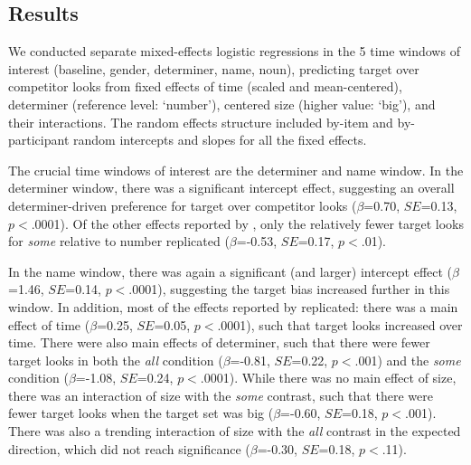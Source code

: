 \documentclass[10pt,letterpaper]{article}
\begin{document}
\subsection{Results}

We conducted separate mixed-effects logistic regressions in the 5 time windows of interest (baseline, gender, determiner, name, noun), predicting target over competitor looks from fixed effects of time (scaled and mean-centered), determiner (reference level: `number'), centered size (higher value: `big'), and their interactions. The random effects structure included by-item and by-participant random intercepts and slopes for all the fixed effects.

The crucial time windows of interest are the determiner and name window. In the determiner window, there was a significant intercept effect, suggesting an overall determiner-driven preference for target over competitor looks ($\beta$=0.70, $SE$=0.13, $p<$.0001). Of the other effects reported by , only the relatively fewer target looks for \emph{some} relative to number replicated  ($\beta$=-0.53, $SE$=0.17, $p<$.01).

In the name window, there was again a significant (and larger) intercept effect ($\beta$=1.46, $SE$=0.14, $p<$.0001), suggesting the target bias increased further in this window. In addition, most of the effects reported by  replicated: there was a main effect of time  ($\beta$=0.25, $SE$=0.05, $p<$.0001), such that target looks increased over time. There were also main effects of determiner, such that there were fewer target looks in both the \emph{all} condition  ($\beta$=-0.81, $SE$=0.22, $p<$.001) and the \emph{some} condition   ($\beta$=-1.08, $SE$=0.24, $p<$.0001). While there was no main effect of size, there was an interaction of size with the \emph{some} contrast, such that there were fewer target looks when the target set was big   ($\beta$=-0.60, $SE$=0.18, $p<$.001). There was also a trending interaction of size with the \emph{all} contrast in the expected direction, which did not reach significance ($\beta$=-0.30, $SE$=0.18, $p<$.11).


\end{document}

